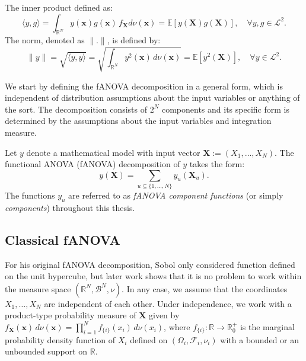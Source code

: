 The inner product defined as:
\[
\langle y, g \rangle = \int_{\mathbb{R}^N} y(\boldsymbol{x}) g(\boldsymbol{x}) \, f_{\boldsymbol{X}}d\nu(\boldsymbol{x}) = \mathbb{E}[y(\boldsymbol{X})g(\boldsymbol{X})], \quad \forall y,g \in \mathcal{L}^2.
\]
The norm, denoted as $\|.\|$, is defined by:
\[
\|y\| = \sqrt{\langle y, y \rangle} = \sqrt{\int_{\mathbb{R}^N} y^2(\boldsymbol{x}) \, d\nu(\boldsymbol{x})} = \mathbb{E}[y^2(\boldsymbol{X})], \quad \forall y \in \mathcal{L}^2.
\]

We start by defining the fANOVA decomposition in a general form, which is independent of distribution assumptions about the input variables or anything of the sort. The decomposition consists of $2^N$ components and its specific form is determined by the assumptions about the input variables and integration measure.

\begin{definition}\label{def:fanova_decomposition}
Let $y$ denote a mathematical model with input vector $\boldsymbol{X} := (X_1, \dots, X_N)$. 
The functional ANOVA (fANOVA) decomposition of $y$ takes the form:
\begin{equation}
    y(\boldsymbol{X}) = \sum_{u \subseteq \{1, \dots, N\}} y_{u}(\boldsymbol{X}_u).
\end{equation}
The functions $y_u$ are referred to as \emph{fANOVA component functions} 
(or simply \emph{components}) throughout this thesis.
\end{definition}



\subsection{Classical fANOVA}
For his original fANOVA decomposition, Sobol only considered function defined on the unit hypercube, but later work shows that it is no problem to work within the measure space $(\mathbb{R}^N, \mathcal{B}^N, \nu)$.
In any case, we assume that the coordinates $X_1, \dots , X_N$ are independent of each other.
Under independence, we work with a product-type probability measure of $\boldsymbol{X}$ given by \(f_{\boldsymbol{X}}(\boldsymbol{x}) \, d\nu(\boldsymbol{x}) = \prod_{i=1}^{N} f_{\{i\}}(x_i) \, d\nu(x_i)\), where \(f_{\{i\}}: \mathbb{R} \rightarrow \mathbb{R}_{0}^{+}\) is the marginal probability density function of \(X_i\) defined on $(\Omega_i, \mathcal{F}_i, \nu_i)$ with a bounded or an unbounded support on $\mathbb{R}$.

